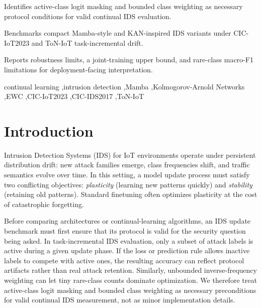 \documentclass[a4paper,fleqn]{cas-dc}
\begin{document}
\begin{highlights}
\item Identifies active-class logit masking and bounded class weighting as necessary protocol conditions for valid continual IDS evaluation.
\item Benchmarks compact Mamba-style and KAN-inspired IDS variants under CIC-IoT2023 and ToN-IoT task-incremental drift.
\item Reports robustness limits, a joint-training upper bound, and rare-class macro-F1 limitations for deployment-facing interpretation.
\end{highlights}

\begin{keywords}
continual learning \sep intrusion detection \sep Mamba \sep Kolmogorov-Arnold Networks \sep EWC \sep CIC-IoT2023 \sep CIC-IDS2017 \sep ToN-IoT
\end{keywords}

\maketitle
\section{Introduction}
Intrusion Detection Systems (IDS) for IoT environments operate under persistent distribution drift: new attack families emerge, class frequencies shift, and traffic semantics evolve over time. In this setting, a model update process must satisfy two conflicting objectives: \textit{plasticity} (learning new patterns quickly) and \textit{stability} (retaining old patterns). Standard finetuning often optimizes plasticity at the cost of catastrophic forgetting.

Before comparing architectures or continual-learning algorithms, an IDS update benchmark must first ensure that its protocol is valid for the security question being asked. In task-incremental IDS evaluation, only a subset of attack labels is active during a given update phase. If the loss or prediction rule allows inactive labels to compete with active ones, the resulting accuracy can reflect protocol artifacts rather than real attack retention. Similarly, unbounded inverse-frequency weighting can let tiny rare-class counts dominate optimization. We therefore treat active-class logit masking and bounded class weighting as necessary preconditions for valid continual IDS measurement, not as minor implementation details.
\end{document}
